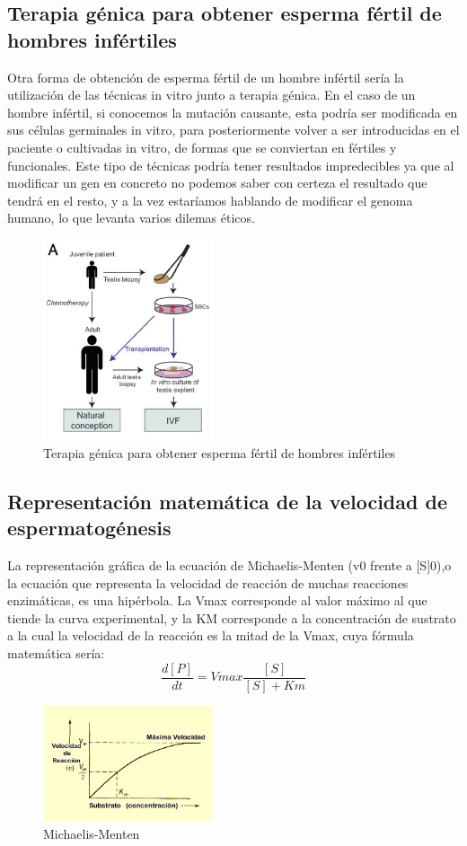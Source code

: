 \documentclass[a4paper,11pt]{article}
\begin{document}
\subsection{Terapia génica para obtener esperma fértil de hombres infértiles}
Otra forma de obtención de esperma fértil de un hombre infértil sería la utilización de las técnicas in vitro junto a terapia génica. En el caso de un hombre infértil, si conocemos la mutación causante, esta podría ser modificada en sus células germinales in vitro, para posteriormente volver a ser introducidas en el paciente o cultivadas in vitro, de formas que se conviertan en fértiles y funcionales. 
Este tipo de técnicas podría tener resultados impredecibles ya que al modificar un gen en concreto no podemos saber con certeza el resultado que tendrá en el resto, y a la vez estaríamos hablando de modificar el genoma humano, lo que levanta varios dilemas éticos. 
\begin{figure}[htb!] 
    \caption{Terapia génica para obtener esperma fértil de hombres infértiles}
    \centering 
    \includegraphics[width=5cm]{cancer-prepuber.jpg}
\end{figure}
\subsection{Representación matemática de la velocidad de espermatogénesis}
La representación gráfica de la ecuación de Michaelis-Menten (v0 frente a [S]0),o la ecuación que representa la velocidad de reacción de muchas reacciones enzimáticas, es una hipérbola. La Vmax corresponde al valor máximo al que tiende la curva experimental, y la KM corresponde a la concentración de sustrato a la cual la velocidad de la reacción es la mitad de la Vmax, cuya fórmula matemática sería:\\
$$\frac{d[P]}{dt}=Vmax\frac{[S]}{[S]+Km}$$
\begin{figure}[htb!] 
    \caption{Michaelis-Menten}
    \centering 
    \includegraphics[width=5cm]{grafica.jpg}
\end{figure}
\cite{Bruel2020433}
\cite{Nachmanson2020}
\cite{Roveto2021}
\cite{Shigemizu2020}


\end{document}
